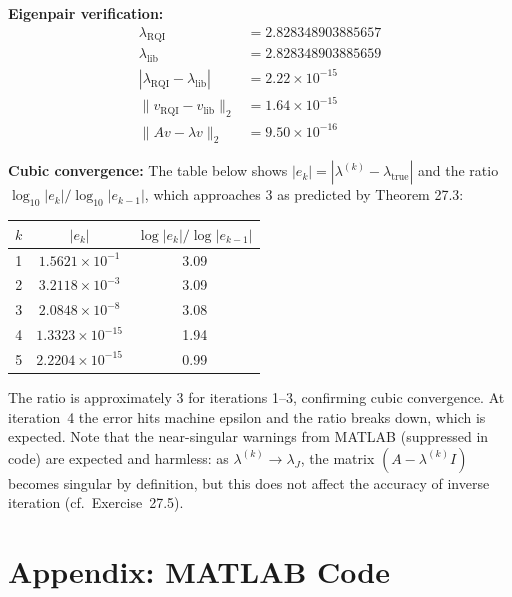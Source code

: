 \documentclass[11pt]{article}
\begin{document}
\textbf{Eigenpair verification:}
\begin{align*}
\lambda_{\mathrm{RQI}} &= 2.828348903885657 \\
\lambda_{\mathrm{lib}} &= 2.828348903885659 \\
|\lambda_{\mathrm{RQI}} - \lambda_{\mathrm{lib}}| &= 2.22\times10^{-15} \\
\|v_{\mathrm{RQI}} - v_{\mathrm{lib}}\|_2 &= 1.64\times10^{-15} \\
\|Av - \lambda v\|_2 &= 9.50\times10^{-16}
\end{align*}

\textbf{Cubic convergence:} The table below shows $|e_k| = |\lambda^{(k)} - \lambda_{\mathrm{true}}|$ and the ratio $\log_{10}|e_k|/\log_{10}|e_{k-1}|$, which approaches 3 as predicted by Theorem 27.3:

\begin{center}
\begin{tabular}{ccc}
\hline
$k$ & $|e_k|$ & $\log|e_k|/\log|e_{k-1}|$ \\
\hline
1 & $1.5621\times10^{-1}$ & 3.09 \\
2 & $3.2118\times10^{-3}$ & 3.09 \\
3 & $2.0848\times10^{-8}$ & 3.08 \\
4 & $1.3323\times10^{-15}$ & 1.94 \\
5 & $2.2204\times10^{-15}$ & 0.99 \\
\hline
\end{tabular}
\end{center}

The ratio is approximately 3 for iterations 1--3, confirming cubic convergence. At iteration~4 the error hits machine epsilon and the ratio breaks down, which is expected. Note that the near-singular warnings from MATLAB (suppressed in code) are expected and harmless: as $\lambda^{(k)}\to\lambda_J$, the matrix $(A-\lambda^{(k)}I)$ becomes singular by definition, but this does not affect the accuracy of inverse iteration (cf.\ Exercise~27.5).

\newpage
\section*{Appendix: MATLAB Code}



\newpage
\end{document}
